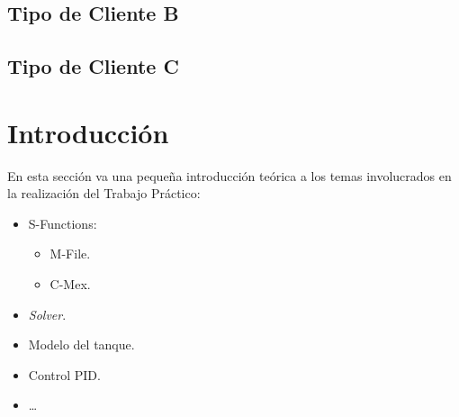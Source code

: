 \documentclass[10pt]{article}
\begin{document}
\begin{footnotesize}
\begin{minipage}{\textwidth}
\end{minipage}
\end{footnotesize}

\subsection{Tipo de Cliente B}
\subsection{Tipo de Cliente C}


\section{Introducción}
En esta sección va una pequeña introducción teórica a los temas involucrados 
en la realización del Trabajo Práctico:

\begin{itemize}
\item S-Functions: \begin{itemize} \item M-File. \item C-Mex. \end{itemize}
\item \textit{Solver}.
\item Modelo del tanque.
\item Control PID.
\item \dots
\end{itemize}
\end{document}
